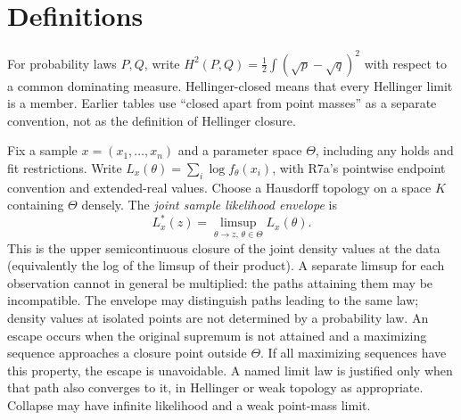 \documentclass[11pt]{article}
\theoremstyle{plain}
\theoremstyle{definition}
\theoremstyle{remark}
\begin{document}
\section{Definitions}\label{sec:closure-frame}

For probability laws $P,Q$, write $H^2(P,Q)=\tfrac12\int(\sqrt p-\sqrt q)^2$ with respect to a common dominating measure. Hellinger-closed means that every Hellinger limit is a member. Earlier tables use ``closed apart from point masses'' as a separate convention, not as the definition of Hellinger closure.

Fix a sample $x=(x_1,\ldots,x_n)$ and a parameter space $\Theta$, including any holds and fit restrictions. Write $L_x(\theta)=\sum_i\log f_\theta(x_i)$, with R7a's pointwise endpoint convention and extended-real values. Choose a Hausdorff topology on a space $K$ containing $\Theta$ densely. The \emph{joint sample likelihood envelope} is
\[
 L_x^*(z)=\limsup_{\theta\to z,\,\theta\in\Theta} L_x(\theta).
\]
This is the upper semicontinuous closure of the joint density values at the data (equivalently the log of the limsup of their product). A separate limsup for each observation cannot in general be multiplied: the paths attaining them may be incompatible. The envelope may distinguish paths leading to the same law; density values at isolated points are not determined by a probability law. An escape occurs when the original supremum is not attained and a maximizing sequence approaches a closure point outside $\Theta$. If all maximizing sequences have this property, the escape is unavoidable. A named limit law is justified only when that path also converges to it, in Hellinger or weak topology as appropriate. Collapse may have infinite likelihood and a weak point-mass limit.
\end{document}
